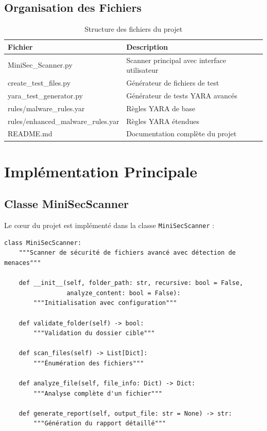 \documentclass[12pt,a4paper]{report}
\begin{document}
\subsection{Organisation des Fichiers}

\begin{table}[h]
\centering
\begin{tabular}{|l|l|}
\hline
\textbf{Fichier} & \textbf{Description} \\
\hline
MiniSec\_Scanner.py & Scanner principal avec interface utilisateur \\
create\_test\_files.py & Générateur de fichiers de test \\
yara\_test\_generator.py & Générateur de tests YARA avancés \\
rules/malware\_rules.yar & Règles YARA de base \\
rules/enhanced\_malware\_rules.yar & Règles YARA étendues \\
README.md & Documentation complète du projet \\
\hline
\end{tabular}
\caption{Structure des fichiers du projet}
\end{table}

\section{Implémentation Principale}

\subsection{Classe MiniSecScanner}

Le cœur du projet est implémenté dans la classe \texttt{MiniSecScanner} :

\begin{lstlisting}[caption={Structure de la classe principale}]
class MiniSecScanner:
    """Scanner de sécurité de fichiers avancé avec détection de menaces"""
    
    def __init__(self, folder_path: str, recursive: bool = False, 
                 analyze_content: bool = False):
        """Initialisation avec configuration"""
        
    def validate_folder(self) -> bool:
        """Validation du dossier cible"""
        
    def scan_files(self) -> List[Dict]:
        """Énumération des fichiers"""
        
    def analyze_file(self, file_info: Dict) -> Dict:
        """Analyse complète d'un fichier"""
        
    def generate_report(self, output_file: str = None) -> str:
        """Génération du rapport détaillé"""
\end{lstlisting}
\end{document}
